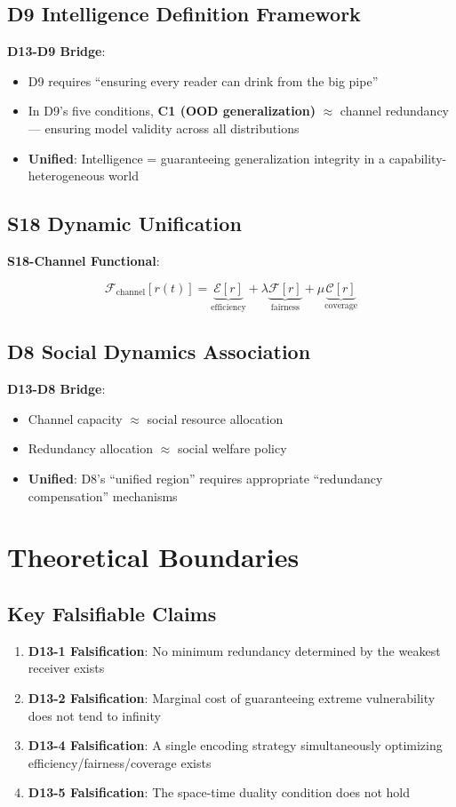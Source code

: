 \documentclass[12pt,a4paper]{article}
\newcommand{\calEcode}{\mathcal{E}[r]}
\newcommand{\calFcode}{\mathcal{F}[r]}
\newcommand{\calCcode}{\mathcal{C}[r]}
\newcommand{\calFchannel}{\mathcal{F}_{\text{channel}}}
\begin{document}
\subsection{D9 Intelligence Definition Framework}

\textbf{D13-D9 Bridge}:
\begin{itemize}
    \item D9 requires ``ensuring every reader can drink from the big pipe''
    \item In D9's five conditions, \textbf{C1 (OOD generalization)} $\approx$ channel redundancy --- ensuring model validity across all distributions
    \item \textbf{Unified}: Intelligence = guaranteeing generalization integrity in a capability-heterogeneous world
\end{itemize}

\subsection{S18 Dynamic Unification}

\textbf{S18-Channel Functional}:

$$\calFchannel[r(t)] = \underbrace{\calEcode}_{\text{efficiency}} + \lambda \underbrace{\calFcode}_{\text{fairness}} + \mu \underbrace{\calCcode}_{\text{coverage}}$$

\subsection{D8 Social Dynamics Association}

\textbf{D13-D8 Bridge}:
\begin{itemize}
    \item Channel capacity $\approx$ social resource allocation
    \item Redundancy allocation $\approx$ social welfare policy
    \item \textbf{Unified}: D8's ``unified region'' requires appropriate ``redundancy compensation'' mechanisms
\end{itemize}

\section{Theoretical Boundaries}

\subsection{Key Falsifiable Claims}
\begin{enumerate}
    \item \textbf{D13-1 Falsification}: No minimum redundancy determined by the weakest receiver exists
    \item \textbf{D13-2 Falsification}: Marginal cost of guaranteeing extreme vulnerability does not tend to infinity
    \item \textbf{D13-4 Falsification}: A single encoding strategy simultaneously optimizing efficiency/fairness/coverage exists
    \item \textbf{D13-5 Falsification}: The space-time duality condition does not hold
\end{enumerate}
\end{document}
